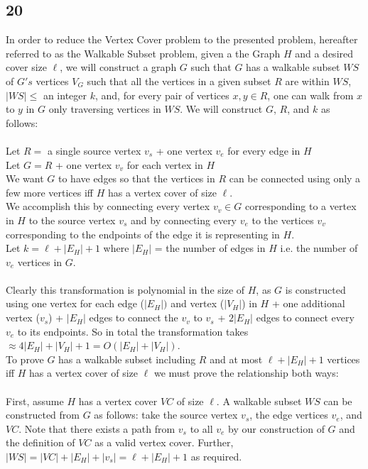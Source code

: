 \documentclass[letterpaper,notitlepage,twoside]{article}
\begin{document}
\subsection*{20}
In order to reduce the Vertex Cover problem to the presented problem, hereafter referred to as the Walkable Subset problem, given a the Graph $H$ and a desired cover size $\ell$, we will construct a graph $G$ such that $G$ has a walkable subset $WS$ of $G's$ vertices $V_G$ such that all the vertices in a given subset $R$ are within $WS$, $|WS| \leq$ an integer $k$, and, for every pair of vertices $x, y \in R$, one can walk from $x$ to $y$ in $G$ only traversing vertices in $WS$. We will construct $G$, $R$, and $k$ as follows: \\\\
Let $R =$ a single source vertex $v_s$ + one vertex $v_e$ for every edge in $H$\\
Let $G = R$ + one vertex $v_v$ for each vertex in $H$\\
We want $G$ to have edges so that the vertices in $R$ can be connected using only a few more vertices iff $H$ has a vertex cover of size $\ell$. \\
We accomplish this by connecting every vertex $v_v \in G$ corresponding to a vertex in $H$ to the source vertex $v_s$ and by connecting every $v_e$ to the vertices $v_v$ corresponding to the endpoints of the edge it is representing in $H$. \\
Let $k = \ell + |E_H| + 1$ where $|E_H|$ = the number of edges in $H$ i.e. the number of $v_e$ vertices in $G$.\\\\
Clearly this transformation is polynomial in the size of $H$, as $G$ is constructed using one vertex for each edge ($|E_H|)$ and vertex ($|V_H|$) in $H$ + one additional vertex ($v_s$) + $|E_H|$ edges to connect the $v_v$ to $v_s$ + $2|E_H|$ edges to connect every $v_e$ to its endpoints. So in total the transformation takes $\approx 4|E_H| + |V_H| + 1 = O(|E_H| + |V_H|)$.\\
To prove $G$ has a walkable subset including $R$ and at most $\ell + |E_H| + 1$ vertices iff $H$ has a vertex cover of size $\ell$ we must prove the relationship both ways: \\\\
First, assume $H$ has a vertex cover $VC$ of size $\ell$. A walkable subset $WS$ can be constructed from $G$ as follows: take the source vertex $v_s$, the edge vertices $v_e$, and $VC$. Note that there exists a path from $v_s$ to all $v_e$ by our construction of $G$ and the definition of $VC$ as a valid vertex cover. Further, $|WS| = |VC| + |E_H| + |v_s| = \ell + |E_H| + 1$ as required. \\\\
\end{document}
